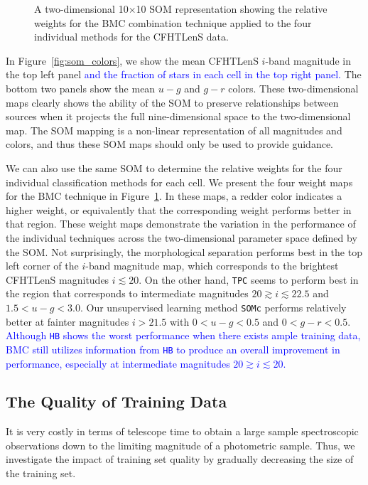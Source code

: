 \documentclass[useAMS,usenatbib]{mn2e}
\begin{document}
\begin{figure}
\begin{minipage}[b]{0.49\linewidth}
    \caption{A two-dimensional 10$\times$10 SOM representation
             showing the relative weights for the BMC combination technique
             applied to the four individual methods for the CFHTLenS data.}
    \label{fig:weights}
  \end{minipage}
\end{figure}

In Figure~\ref{fig:som_colors}, we show
the mean CFHTLenS $i$-band magnitude in the top left panel
\textcolor{blue}{
and the fraction of stars in each cell in the top right panel.
}
The bottom two panels show the mean $u-g$ and  $g-r$ colors.
These two-dimensional maps clearly shows
the ability of the SOM to preserve relationships between sources
when it projects the full nine-dimensional space to the two-dimensional map.
The SOM mapping is a non-linear representation of all magnitudes and colors,
and thus these SOM maps should only be used to provide guidance.

We can also use the same SOM to determine the relative weights for 
the four individual classification methods for each cell.
We present the four weight maps for the BMC technique
in Figure~\ref{fig:weights}.
In these maps, a redder color indicates a higher weight,
or equivalently that the corresponding weight performs better in that region.
These weight maps demonstrate the variation in
the performance of the individual techniques across
the two-dimensional parameter space defined by the SOM.
Not surprisingly, the morphological separation
performs best in the top left corner of the $i$-band magnitude map,
which corresponds to the brightest CFHTLenS magnitudes $i \lesssim 20$.
On the other hand, \texttt{TPC} seems to perform best
in the region that corresponds to intermediate magnitudes
$20\gtrsim i \lesssim22.5$ and $1.5<u-g<3.0$.
Our unsupervised learning method \texttt{SOMc}
performs relatively better at fainter magnitudes $i>21.5$
with $0<u-g<0.5$ and $0<g-r<0.5$.
\textcolor{blue}{
Although \texttt{HB} shows the worst performance
when there exists ample training data,
BMC still utilizes information from \texttt{HB}
to produce an overall improvement in performance,
especially at intermediate magnitudes $20\gtrsim i \lesssim20$.
}

\subsection{The Quality of Training Data}
  \label{section:quality_training}

It is very costly in terms of telescope time to
obtain a large sample spectroscopic observations
down to the limiting magnitude of a photometric sample.
Thus, we investigate the impact of training set quality
by gradually decreasing the size of the training set.
\end{document}
